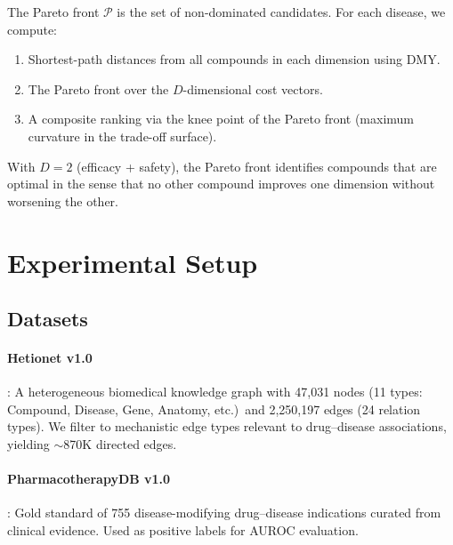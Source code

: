 \documentclass[11pt,a4paper]{article}
\begin{document}
The Pareto front $\mathcal{P}$ is the set of non-dominated candidates.
For each disease, we compute:
\begin{enumerate}
    \item Shortest-path distances from all compounds in each dimension
    using DMY.
    \item The Pareto front over the $D$-dimensional cost vectors.
    \item A composite ranking via the knee point of the Pareto front
    (maximum curvature in the trade-off surface).
\end{enumerate}

With $D = 2$ (efficacy + safety), the Pareto front identifies
compounds that are optimal in the sense that no other compound
improves one dimension without worsening the other.

\section{Experimental Setup}
\label{sec:setup}

\subsection{Datasets}
\label{sec:setup:data}

\paragraph{Hetionet v1.0} \citep{himmelstein2017systematic}:
A heterogeneous biomedical knowledge graph with 47,031 nodes
(11 types: Compound, Disease, Gene, Anatomy, etc.)\ and
2,250,197 edges (24 relation types). We filter to mechanistic
edge types relevant to drug--disease associations, yielding
$\sim$870K directed edges.

\paragraph{PharmacotherapyDB v1.0} \citep{himmelstein2016pharmacotherapydb}:
Gold standard of 755 disease-modifying drug--disease indications
curated from clinical evidence. Used as positive labels for AUROC
evaluation.
\end{document}

